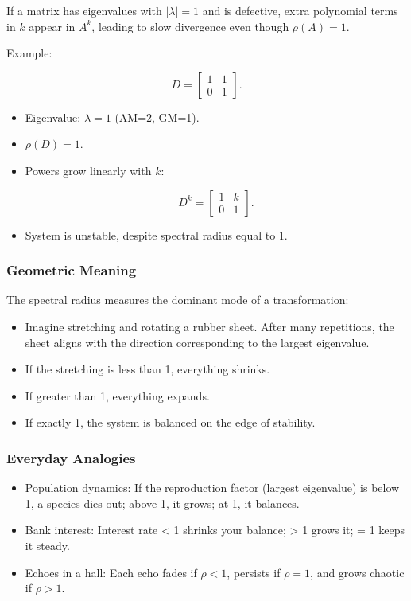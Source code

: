 \documentclass[
  letterpaper,
  DIV=11,
  numbers=noendperiod]{scrreprt}
\providecommand{\tightlist}{%
  \setlength{\itemsep}{0pt}\setlength{\parskip}{0pt}}
\begin{document}
If a matrix has eigenvalues with \(|\lambda|=1\) and is defective, extra
polynomial terms in \(k\) appear in \(A^k\), leading to slow divergence
even though \(\rho(A)=1\).

Example:

\[
D = \begin{bmatrix} 1 & 1 \\ 0 & 1 \end{bmatrix}.
\]

\begin{itemize}
\item
  Eigenvalue: \(\lambda=1\) (AM=2, GM=1).
\item
  \(\rho(D)=1\).
\item
  Powers grow linearly with \(k\):

  \[
  D^k = \begin{bmatrix} 1 & k \\ 0 & 1 \end{bmatrix}.
  \]
\item
  System is unstable, despite spectral radius equal to 1.
\end{itemize}

\subsubsection{Geometric Meaning}\label{geometric-meaning-15}

The spectral radius measures the dominant mode of a transformation:

\begin{itemize}
\tightlist
\item
  Imagine stretching and rotating a rubber sheet. After many
  repetitions, the sheet aligns with the direction corresponding to the
  largest eigenvalue.
\item
  If the stretching is less than 1, everything shrinks.
\item
  If greater than 1, everything expands.
\item
  If exactly 1, the system is balanced on the edge of stability.
\end{itemize}

\subsubsection{Everyday Analogies}\label{everyday-analogies-64}

\begin{itemize}
\tightlist
\item
  Population dynamics: If the reproduction factor (largest eigenvalue)
  is below 1, a species dies out; above 1, it grows; at 1, it balances.
\item
  Bank interest: Interest rate \textless{} 1 shrinks your balance;
  \textgreater{} 1 grows it; = 1 keeps it steady.
\item
  Echoes in a hall: Each echo fades if \(\rho<1\), persists if
  \(\rho=1\), and grows chaotic if \(\rho>1\).
\end{itemize}
\end{document}
